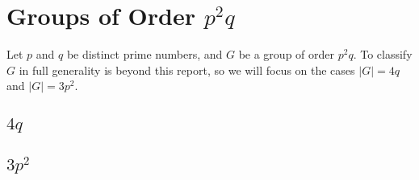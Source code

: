 \section{Groups of Order \(p^2q\)}
Let \(p\) and \(q\) be distinct prime numbers, and \(G\) be a group of order \(p^2q\).
To classify \(G\) in full generality is beyond this report, so we will focus on the cases \(|G| = 4q\) and \(|G| =
3p^2\).

\subsection{\(4q\)}

\subsection{\(3p^2\)}
